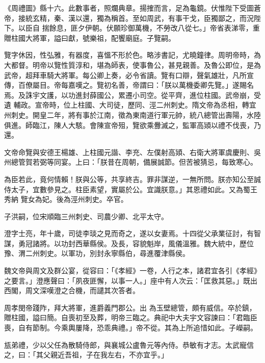 \begin{pinyinscope}
 《周禮圖》縣十六。此數事者，照爛典章。揚搉而言，足為龜鏡。伏惟陛下受圖蒼帝，接統玄精，秦、漢以還，獨為稱首。至如周武，有事干戈，臣獨鄙之，而況陛下。以臣自
 揣餘息，匪夕伊朝。伏願珍御萬機，不勞改八從七。」帝省表涕零，重贈柱國大將軍，謚曰獻，號樂祖，配饗廟庭。子覽嗣。



 覽字休因，性弘雅，有器度，喜慍不形於色。略涉書記，尤曉鐘律。周明帝時，為大都督。明帝以覽性質淳和，堪為師表，使事魯公，甚見親善。及魯公即位，是為武帝，超拜車騎大將軍。每公卿上奏，必令省讀。覽有口辯，聲氣雄壯，凡所宣傳，百僚屬目。帝每嘉嘆之。覽初名善，帝謂曰：「朕以萬機委卿先覽。」遂賜名焉。及誅宇文護，以功進封薛國公，累遷小司空。從平齊，進位柱國。武帝崩，受遺
 輔政。宣帝時，位上柱國、大司徒，歷同、涇二州刺史。隋文帝為丞相，轉宜州刺史。開皇二年，將有事於江南，徵為東南道行軍元帥，統八總管出壽陽，水陸俱進。師臨江，陳人大駭。會陳宣帝殂，覽欲乘釁滅之，監軍高熲以禮不伐喪，乃還。



 文帝命覽與安德王楊雄、上柱國元諧、李充、左僕射高熲、右衛大將軍虞慶則、吳州總管賀若弼等同宴。上曰：「朕昔在周朝，備展誠節。但苦被猜忌，每致寒心。



 為臣若此，竟何情賴！朕與公等，共享終吉。罪非謀逆，一無所問。朕亦知公至誠侍太子，宜數參見之。柱臣素望，實屬於公。宜識朕意。」其恩禮如此。又為蜀王秀納
 覽女為妃。後為涇州刺史。卒官。



 子洪嗣，位宋順臨三州刺史、司農少卿、北平太守。



 澄字士亮，年十歲，司徒李琰之見而奇之，遂以女妻焉。十四從父承業征討，有智謀，勇冠諸將。以功封西華縣侯。及長，容貌魁岸，風儀溫雅。魏大統中，歷位豫、渭二州刺史。以軍功，別封永寧縣伯，尋進覆津縣侯。



 魏文帝與周文及群公宴，從容曰：「《孝經》一卷，人行之本，諸君宜各引《孝經》之要言。」澄應聲曰：「夙夜匪懈，以事一人。」座中有人次云：「匡救其惡。」既出西閣，周文深嘆澄之合機，而譴其次答者。



 周孝閔帝踐阼，拜大將軍，進爵義門郡公。出
 為玉壁總管，頗有威信。卒於鎮，贈柱國，謚曰簡。自喪初至及葬，明帝三臨之。典祀中大夫宇文容諫曰：「君臨臣喪，自有節制。今乘輿屢降，恐乖典禮。」帝不從。其為上所追惜如此。子嶸嗣。



 瓬弟禮，少以父任為散騎侍郎，與襄城公盧魯元等內侍。恭敏有才志。太武寵信之，曰：「其父親近吾祖，子在我左右，不亦宜乎。」




\end{pinyinscope}
